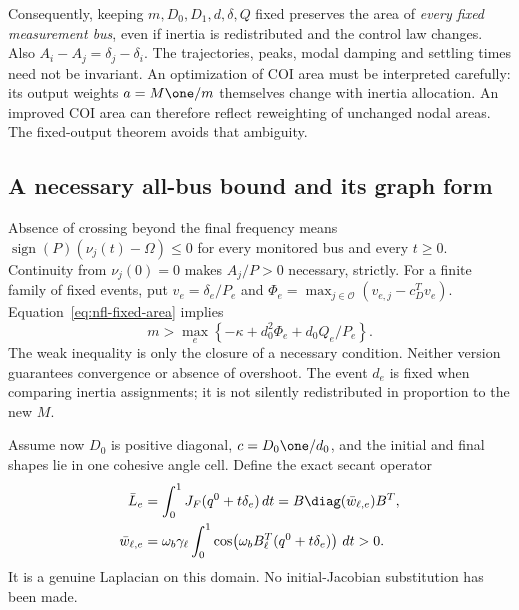 Consequently, keeping $m,D_0,D_1,d,\delta,Q$ fixed preserves the area of
\emph{every fixed measurement bus}, even if inertia is redistributed and
the control law changes. Also
$A_i-A_j=\delta_j-\delta_i$.
The trajectories, peaks, modal damping and settling times need not be
invariant. An optimization of COI area must be interpreted carefully:
its output weights $a=M\one/m$ themselves change with inertia allocation.
An improved COI area can therefore reflect reweighting of unchanged nodal
areas. The fixed-output theorem avoids that ambiguity.

\subsection{A necessary all-bus bound and its graph form}
Absence of crossing beyond the final frequency means
$\operatorname{sign}(P)(\nu_j(t)-\Omega)\leq0$ for every monitored bus and
every $t\geq0$. Continuity from $\nu_j(0)=0$ makes $A_j/P>0$ necessary,
strictly. For a finite family of fixed events, put
$v_e=\delta_e/P_e$ and
$\Phi_e=\max_{j\in\mathcal O}(v_{e,j}-c_D^Tv_e)$.
Equation~\eqref{eq:nfl-fixed-area} implies
\begin{equation}
 \boxed{m>\max_e\left\{-\kappa+d_0^2\Phi_e+
                              d_0 Q_e/P_e\right\}.}
 \label{eq:nfl-general-floor}
\end{equation}
The weak inequality is only the closure of a necessary condition.
Neither version guarantees convergence or absence of overshoot.
The event $d_e$ is fixed when comparing inertia assignments; it is not
silently redistributed in proportion to the new $M$.

Assume now $D_0$ is positive diagonal, $c=D_0\one/d_0$, and the initial
and final shapes lie in one cohesive angle cell. Define the exact secant
operator
\begin{align}
 \bar L_e&=\int_0^1J_F(q^0+t\delta_e)\,dt
          =B\diag(\bar w_{\ell,e})B^T,\\
 \bar w_{\ell,e}
    &=\omega_b\gamma_\ell\int_0^1
          \cos\!\left(\omega_b B_\ell^T(q^0+t\delta_e)\right)\,dt>0.
 \label{eq:nfl-secant}
\end{align}
It is a genuine Laplacian on this domain. No initial-Jacobian substitution
has been made.

